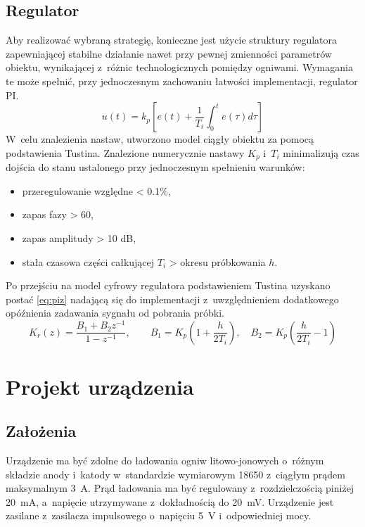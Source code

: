 \documentclass[polish,engineer]{polsl-msth}
\begin{document}
\section{Regulator}
Aby realizować wybraną strategię, konieczne jest użycie struktury regulatora zapewniającej stabilne działanie nawet przy pewnej zmienności parametrów obiektu, wynikającej z~różnic technologicznych pomiędzy ogniwami. Wymagania te może spełnić, przy jednoczesnym zachowaniu łatwości implementacji, regulator PI.
\begin{equation}
     u(t)=k_{p}\left[e(t)+{\frac {1}{T_{i}}}\int _{0}^{t}e(\tau )d\tau \right]
     \label{eq:PI_timebased}
\end{equation}
W~celu znalezienia nastaw, utworzono model ciągły obiektu za pomocą podstawienia Tustina. Znalezione numerycznie nastawy $K_p$ i~$T_i$ minimalizują czas dojścia do stanu ustalonego przy jednoczesnym spełnieniu warunków:
\begin{itemize}
    \item przeregulowanie względne < 0.1\%,
    \item zapas fazy > 60\degree,
    \item zapas amplitudy > 10 dB,
    \item stała czasowa części całkującej $T_i$ > okresu próbkowania $h$.
\end{itemize}
 Po przejściu na model cyfrowy regulatora podstawieniem Tustina uzyskano postać \ref{eq:piz} nadającą się do implementacji z~uwzględnieniem dodatkowego opóźnienia zadawania sygnału od pobrania próbki.
 \begin{equation}
K_r(z) = \frac{B_1+B_2 z^{-1}}{1 - z^{-1}}, \qquad
B_1 = K_p\left(1+\frac{h}{2T_i}\right), \quad B_2 = K_p\left(\frac{h}{2T_i}-1\right)
\label{eq:piz}
 \end{equation}

\chapter{Projekt urządzenia}
\section{Założenia}
Urządzenie ma być zdolne do ładowania ogniw litowo-jonowych o~różnym składzie anody i~katody w~standardzie wymiarowym 18650 z~ciągłym prądem maksymalnym 3~A. Prąd ładowania ma być regulowany z~rozdzielczością piniżej 20~mA, a~napięcie utrzymywane z~dokładnością do 20~mV. Urządzenie jest zasilane z~zasilacza impulsowego o~napięciu 5~V i~odpowiedniej mocy.
\end{document}

